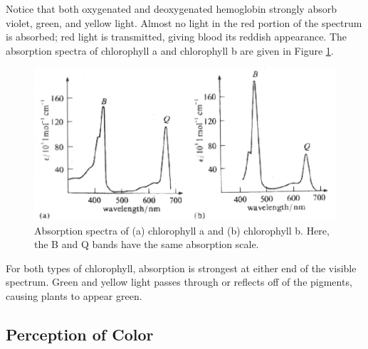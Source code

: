 Notice that both oxygenated and deoxygenated hemoglobin strongly absorb violet, green, and yellow light.  Almost no light in the red portion of the spectrum is absorbed; red light is transmitted, giving blood its reddish appearance.  The absorption spectra of chlorophyll a and chlorophyll b are given in Figure \ref{Fig6-8}.
\begin{figure}[h]
	\centering
	\includegraphics[width=4.5in]{./figures/Topic6/Fig6-8.png}
	\caption{Absorption spectra of (a) chlorophyll a and (b) chlorophyll b.  Here, the B and Q bands have the same absorption scale.}
	\label{Fig6-8}
\end{figure}    
For both types of chlorophyll, absorption is strongest at either end of the visible spectrum.  Green and yellow light passes through or reflects off of the pigments, causing plants to appear green.

\subsection{Perception of Color}

